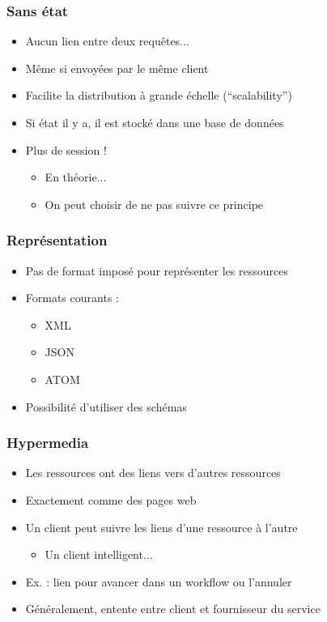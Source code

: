 \begin{frame}
 \frametitle{Sans état}
 
 \begin{itemize}
  \item Aucun lien entre deux requêtes...
  \item Même si envoyées par le même client
  \item Facilite la distribution à grande échelle (``scalability'')
  \item Si état il y a, il est stocké dans une base de données
  \item Plus de session !
  \begin{itemize}
   \item En théorie...
   \item On peut choisir de ne pas suivre ce principe
  \end{itemize}
 \end{itemize} 

\end{frame}

\begin{frame}
 \frametitle{Représentation}
 
 \begin{itemize}
  \item Pas de format imposé pour représenter les ressources
  \item Formats courants :
  \begin{itemize}
   \item XML
   \item JSON
   \item ATOM
  \end{itemize}
  \item Possibilité d'utiliser des schémas
 \end{itemize} 

\end{frame}

\begin{frame}
 \frametitle{Hypermedia}
 
 \begin{itemize}
  \item Les ressources ont des liens vers d'autres ressources
  \item Exactement comme des pages web
  \item Un client peut suivre les liens d'une ressource à l'autre
  \begin{itemize}
   \item Un client intelligent...
  \end{itemize}
  \item Ex. : lien pour avancer dans un workflow ou l'annuler
  \item Généralement, entente entre client et fournisseur du service
 \end{itemize} 

\end{frame}